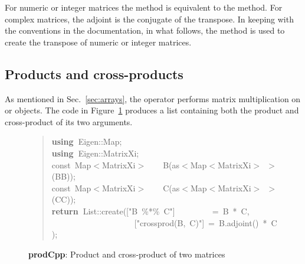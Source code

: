 \documentclass[shortnames,article]{jss}
\newcommand{\hlstd}[1]{\textcolor[rgb]{0,0,0}{#1}}
\newcommand{\hlopt}[1]{\textcolor[rgb]{0,0,0}{#1}}
\newcommand{\hlstr}[1]{\textcolor[rgb]{0.90,0.15,0.15}{#1}}
\newcommand{\hlkwa}[1]{\textcolor[rgb]{0.61,0.13,0.93}{\bf{#1}}}
\newcommand{\hlkwb}[1]{\textcolor[rgb]{0.13,0.54,0.13}{#1}}
\newcommand{\hlkwd}[1]{\textcolor[rgb]{0,0,0}{#1}}
\begin{document}
For numeric or integer matrices the  method is
equivalent to the  method.  For complex matrices, the
adjoint is the conjugate of the transpose.  In keeping with the
conventions in the  documentation, in what follows,
the  method is used to create the transpose of numeric or
integer matrices.


\subsection{Products and cross-products}
\label{sec:products}

As mentioned in Sec.~\ref{sec:arrays}, the  operator
performs matrix multiplication on  or
 objects. The  code in
Figure~\ref{prod} produces a list containing both the product and
cross-product of its two arguments.

\begin{figure}[htb]
  \begin{quote}
    \noindent
    \ttfamily
    \hlstd{}\hlkwa{using\ }\hlstd{Eigen}\hlopt{::}\hlstd{Map}\hlopt{;}\hspace*{\fill}\\
    \hlstd{}\hlkwa{using\ }\hlstd{Eigen}\hlopt{::}\hlstd{MatrixXi}\hlopt{;}\hspace*{\fill}\\
    \hlstd{}\hlkwb{const\ }\hlstd{Map}\hlopt{$<$}\hlstd{MatrixXi}\hlopt{$>$}\hlstd{\ \ \ \ }\hlopt{}\hlstd{}\hlkwd{B}\hlstd{}\hlopt{(}\hlstd{as}\hlopt{$<$}\hlstd{Map}\hlopt{$<$}\hlstd{MatrixXi}\hlopt{$>$\ $>$(}\hlstd{BB}\hlopt{));}\hspace*{\fill}\\
    \hlstd{}\hlkwb{const\ }\hlstd{Map}\hlopt{$<$}\hlstd{MatrixXi}\hlopt{$>$}\hlstd{\ \ \ \ }\hlopt{}\hlstd{}\hlkwd{C}\hlstd{}\hlopt{(}\hlstd{as}\hlopt{$<$}\hlstd{Map}\hlopt{$<$}\hlstd{MatrixXi}\hlopt{$>$\ $>$(}\hlstd{CC}\hlopt{));}\hspace*{\fill}\\
    \hlstd{}\hlkwa{return\ }\hlstd{List}\hlopt{::}\hlstd{}\hlkwd{create}\hlstd{}\hlopt{(}\hlstd{\textunderscore }\hlopt{{[}}\hlstd{}\hlstr{"B\ \%{*}\%\ C"}\hlstd{}\hlopt{{]}}\hlstd{\ \ \ \ \ \ \ \ \ }\hlopt{=\ }\hlstd{B\ }\hlopt{{*}\ }\hlstd{C}\hlopt{,}\hspace*{\fill}\\
    \hlstd{}\hlstd{\ \ \ \ \ \ \ \ \ \ \ \ \ \ \ \ \ \ \ \ }\hlstd{\textunderscore }\hlopt{{[}}\hlstd{}\hlstr{"crossprod(B,\ C)"}\hlstd{}\hlopt{{]}\ =\ }\hlstd{B}\hlopt{.}\hlstd{}\hlkwd{adjoint}\hlstd{}\hlopt{()\ {*}\ }\hlstd{C}\hlopt{);}\hlstd{}\hspace*{\fill}
    \normalfont
    \normalsize
  \end{quote}
  \caption{\textbf{prodCpp}: Product and cross-product of two matrices}
  \label{prod}
\end{figure}
\end{document}
